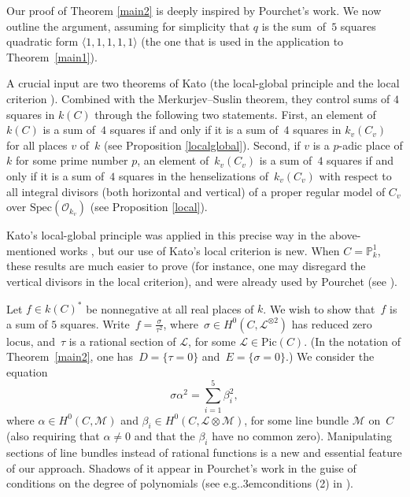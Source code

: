 \documentclass{amsart}
\theoremstyle{definition}
\theoremstyle{remark}
\numberwithin{equation}{section}
\newcommand{\Spec}{\mathrm{Spec}}
\newcommand{\Pic}{\mathrm{Pic}}
\def\eg{e.g.\kern.3em}
\def\P{\mathbb P}
\def\cM{\mathcal{M}}
\def\cL{\mathcal{L}}
\def\cO{\mathcal{O}}
\def\cM{\mathcal{M}}
\begin{document}
Our proof of Theorem \ref{main2} is deeply inspired by Pourchet's work.
We now outline the argument, assuming for simplicity that $q$ is the sum~of~$5$ squares quadratic form $\langle 1,1,1,1,1\rangle$ (the one that is used in the application to Theorem~\ref{main1}).

\vspace{1em}

A crucial input are two theorems of Kato (the local-global principle \cite[Theorem 0.8\,(2)]{Kato} and the local criterion \cite[Proposition~5.2]{Kato}). Combined with the Merkurjev--Suslin theorem, they control sums of $4$ squares in $k(C)$ through the following two statements. First, an element of $k(C)$ is a sum of~$4$ squares if and only if it is a sum of~$4$ squares in $k_v(C_v)$ for all places $v$ of~$k$ (see Proposition \ref{localglobal}). Second, if $v$ is a $p$-adic place of $k$ for some prime number $p$, an element of~$k_v(C_v)$ is a sum of~$4$ squares if and only if it is a sum of~$4$ squares in the henselizations of~$k_v(C_v)$ with respect to all integral divisors (both horizontal and vertical) of a proper regular model of $C_v$ over $\Spec(\cO_{k_v})$ (see Proposition \ref{local}).

Kato's local-global principle was applied in this precise way in the above-men\-tioned works \cite{CTAppendix, CTJ, Popnote, Jannsen}, but our use of Kato's local criterion is new. When $C=\P^1_k$, these results are much easier to prove (for instance, one may disregard the vertical divisors in the local criterion), and were already used by Pourchet (see \cite[Propositions 3 et 4]{Pourchet}).

\vspace{1em}

 Let $f\in k(C)^*$ be nonnegative at all real places of $k$. We wish to show that~$f$ is a sum of $5$ squares. Write~$f=\frac{\sigma}{\tau^2}$, where~$\sigma\in H^0(C,\cL^{\otimes 2})$ has reduced zero locus, and~$\tau$ is a rational section of $\cL$, for some $\cL\in \Pic(C)$. (In the notation of Theorem~\ref{main2}, one has~$D=\{\tau=0\}$ and~$E=\{\sigma=0\}$.) We consider the equation 
\begin{equation}
\label{equalb}
\sigma\alpha^2=\sum_{i=1}^5\beta_i^2,
\end{equation}
where $\alpha\in H^0(C,\cM)$ and $\beta_i\in H^0(C,\cL\otimes \cM)$, for some
line bundle $\cM$ on~$C$ (also requiring that $\alpha\neq 0$ and that the $\beta_i$ have no common zero).
Manipulating sections of line bundles instead of rational functions is a new and essential feature of our approach. Shadows of it appear in Pourchet's work in the guise of conditions on the degree of polynomials (see \eg conditions (2) in \cite[Th\'eor\`emes 1 et 2]{Pourchet}).
\end{document}
